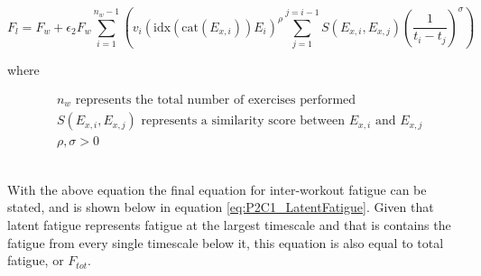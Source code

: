 \begin{minipage}{\textwidth}
	\begin{equation*}
		F_l =
			F_{w} + 
			\epsilon_2 F_w
			\sum_{i=1}^{n_w-1} \left( 
				v_i \left(
					\text{idx}(\text{cat}(E_{x,i})) E_i
				\right)^\rho
				\sum_{j=1}^{j=i-1} S(E_{x,i},E_{x,j})\left(
					\frac{1}{t_i-t_j}
				\right)^\sigma
			\right)
	\end{equation*}
	\centerline{where}
	\begin{equation*}
		\begin{split}
			& n_w \text{ represents the total number of exercises performed} \\
			& S(E_{x,i},E_{x,j}) \text{ represents a similarity score between } E_{x,i} \text{ and } E_{x,j} \\
			& \rho, \sigma >0
		\end{split}
	\end{equation*}
\end{minipage}\\

With the above equation the final equation for inter-workout fatigue can be stated, and is shown below in equation \ref{eq:P2C1_LatentFatigue}. Given that latent fatigue represents fatigue at the largest timescale and that is contains the fatigue from every single timescale below it, this equation is also equal to total fatigue, or $F_{tot}$.

